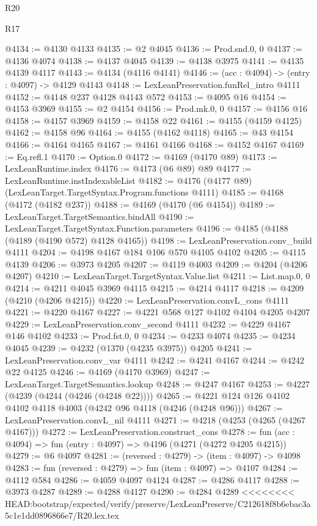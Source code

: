 \begin{lexlean}{R20}
\begin{lexlean}{R17}
\begin{coremodule}
{{{{{{{{{{{{{{{{{{{{{{{{{{{{{{{{{{{{{{{{{{{{{{{{{{{{{{{{{{{{{{{{{{{{{{{{{{{{{{{{{{{{{{{{{{{{{{{{{{{{{{{{{{{@4134 := @4130 @4133
@4135 := @2 @4045
@4136 := Prod.snd.{0, 0}
@4137 := @4136 @4074
@4138 := @4137 @4045
@4139 := @4138 @3975
@4141 := @4135 @4139 @4117
@4143 := @4134 (@4116 @4141)
@4146 := (acc : @4094) -> (entry : @4097) -> @4129 @4143
@4148 := LexLeanPreservation.funRel_intro @4111
@4152 := @4148 @237 @4128 @4143 @572
@4153 := @4095 @16
@4154 := @4153 @3969
@4155 := @2 @4154
@4156 := Prod.mk.{0, 0}
@4157 := @4156 @16
@4158 := @4157 @3969
@4159 := @4158 @22
@4161 := @4155 (@4159 @4125)
@4162 := @4158 @96
@4164 := @4155 (@4162 @4118)
@4165 := @43 @4154
@4166 := @4164 @4165
@4167 := @4161 @4166
@4168 := @4152 @4167
@4169 := Eq.refl.{1}
@4170 := Option.{0}
@4172 := @4169 (@4170 @89)
@4173 := LexLeanRuntime.index
@4176 := @4173 (@6 @89) @89
@4177 := LexLeanRuntime.instIndexableList
@4182 := @4176 (@4177 @89) (LexLeanTarget.TargetSyntax.Program.functions @4111)
@4185 := @4168 (@4172 (@4182 @237))
@4188 := @4169 (@4170 (@6 @4154))
@4189 := LexLeanTarget.TargetSemantics.bindAll
@4190 := LexLeanTarget.TargetSyntax.Function.parameters
@4196 := @4185 (@4188 (@4189 (@4190 @572) @4128 @4165))
@4198 := LexLeanPreservation.conv_build @4111
@4204 := @4198 @4167 @184 @106 @570 @4105 @4102
@4205 := @4115 @4139
@4206 := @3973 @4205
@4207 := @4119 @4003
@4209 := @4204 (@4206 @4207)
@4210 := LexLeanTarget.TargetSyntax.Value.list
@4211 := List.map.{0, 0}
@4214 := @4211 @4045 @3969 @4115
@4215 := @4214 @4117
@4218 := @4209 (@4210 (@4206 @4215))
@4220 := LexLeanPreservation.convL_cons @4111
@4221 := @4220 @4167
@4227 := @4221 @568 @127 @4102 @4104 @4205 @4207
@4229 := LexLeanPreservation.conv_second @4111
@4232 := @4229 @4167 @146 @4102
@4233 := Prod.fst.{0, 0}
@4234 := @4233 @4074
@4235 := @4234 @4045
@4239 := @4232 (@1370 (@4235 @3975)) @4205
@4241 := LexLeanPreservation.conv_var @4111
@4242 := @4241 @4167
@4244 := @4242 @22 @4125
@4246 := @4169 (@4170 @3969)
@4247 := LexLeanTarget.TargetSemantics.lookup
@4248 := @4247 @4167
@4253 := @4227 (@4239 (@4244 (@4246 (@4248 @22))))
@4265 := @4221 @124 @126 @4102 @4102 @4118 @4003 (@4242 @96 @4118 (@4246 (@4248 @96)))
@4267 := LexLeanPreservation.convL_nil @4111
@4271 := @4218 (@4253 (@4265 (@4267 @4167)))
@4272 := LexLeanPreservation.construct_cons
@4278 := fun (acc : @4094) => fun (entry : @4097) => @4196 (@4271 (@4272 @4205 @4215))
@4279 := @6 @4097
@4281 := (reversed : @4279) -> (item : @4097) -> @4098
@4283 := fun (reversed : @4279) => fun (item : @4097) => @4107
@4284 := @4112 @584
@4286 := @4059 @4097 @4124
@4287 := @4286 @4117
@4288 := @3973 @4287
@4289 := @4288 @4127
@4290 := @4284 @4289
<<<<<<<< HEAD:bootstrap/expected/verify/preserve/LexLeanPreserve/C212618f8b6ebac3a5c1e1dd0896866e7/R20.lex.tex
}}}}}}}}}}}}}}}}}}}}}}}}}}}}}}}}}}}}}}}}}}}}}}}}}}}}}}}}}}}}}}}}}}}}}}}}}}}}}}}}}}}}}}}}}}}}}}}}}}}}}}}}}}}
\end{coremodule}
\end{lexlean}
\end{lexlean}
